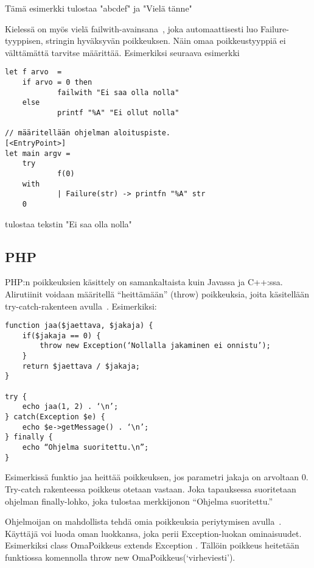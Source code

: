 Tämä esimerkki tulostaa "abcdef" ja "Vielä tänne"


Kielessä on myös vielä failwith-avainsana~\cite{msn_failwith}, joka automaattisesti luo Failure-tyyppisen, stringin hyväksyvän poikkeuksen. Näin omaa poikkeustyyppiä ei välttämättä tarvitse määrittää. Esimerkiksi seuraava esimerkki

\begin{lstlisting}
let f arvo  =
    if arvo = 0 then
            failwith "Ei saa olla nolla"
    else
            printf "%A" "Ei ollut nolla"

// määritellään ohjelman aloituspiste.
[<EntryPoint>]
let main argv =
    try
            f(0)
    with   
            | Failure(str) -> printfn "%A" str
    0
\end{lstlisting}

tulostaa tekstin "Ei saa olla nolla"

    
\subsection{PHP}

\lstset{language=PHP,
	basicstyle=\ttfamily,
	breaklines=true,
	columns=fullflexible}

PHP:n poikkeuksien käsittely on samankaltaista kuin Javassa ja C++:ssa. Alirutiinit voidaan määritellä “heittämään” (throw) poikkeuksia, joita käsitellään try-catch-rakenteen avulla~\cite{man_php_exceptions}. Esimerkiksi:

\begin{lstlisting}
function jaa($jaettava, $jakaja) {
    if($jakaja == 0) {
        throw new Exception(‘Nollalla jakaminen ei onnistu’);
    }
    return $jaettava / $jakaja;
}

try {
    echo jaa(1, 2) . ‘\n’;    
} catch(Exception $e) {
    echo $e->getMessage() . ‘\n’;
} finally {
    echo “Ohjelma suoritettu.\n”;
}
\end{lstlisting}

Esimerkissä funktio jaa heittää poikkeuksen, jos parametri jakaja on arvoltaan 0. Try-catch rakenteessa poikkeus otetaan vastaan. Joka tapauksessa suoritetaan ohjelman finally-lohko, joka tulostaa merkkijonon “Ohjelma suoritettu.”

Ohjelmoijan on mahdollista tehdä omia poikkeuksia periytymisen avulla~\cite{man_php_extended_exceptions}. Käyttäjä voi luoda oman luokkansa, joka perii Exception-luokan ominaisuudet. Esimerkiksi class OmaPoikkeus extends Exception { }. Tällöin poikkeus heitetään funktiossa komennolla throw new OmaPoikkeus(‘virheviesti’).
